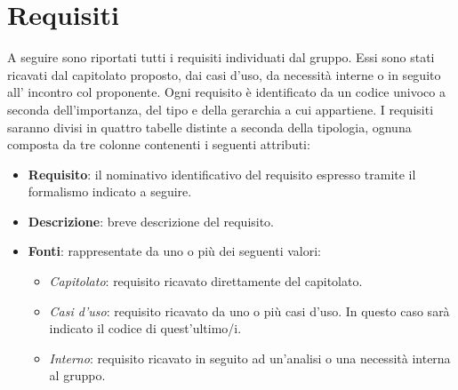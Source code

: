 %


\section{Requisiti}

A seguire sono riportati tutti i requisiti individuati dal gruppo. Essi sono stati ricavati dal capitolato proposto, dai casi d'uso, da necessità interne o in seguito all' incontro col proponente. Ogni requisito è identificato da un codice univoco a seconda dell'importanza, del tipo e della gerarchia a cui appartiene.
I requisiti saranno divisi in quattro tabelle distinte a seconda della tipologia, ognuna composta da tre colonne contenenti i seguenti attributi:
\begin{itemize}
	\item \textbf{Requisito}: il nominativo identificativo del requisito espresso tramite il formalismo indicato a seguire.
	\item \textbf{Descrizione}: breve descrizione del requisito.
	\item \textbf{Fonti}: rappresentate da uno o più dei seguenti valori:
	\begin{itemize}
		\item \emph{Capitolato}: requisito ricavato direttamente del capitolato.
		\item \emph{Casi d'uso}: requisito ricavato da uno o più casi d'uso. In questo caso sarà indicato il codice di quest'ultimo/i.
		\item \emph{Interno}: requisito ricavato in seguito ad un'analisi o una necessità interna al gruppo.
	\end{itemize}
\end{itemize}

